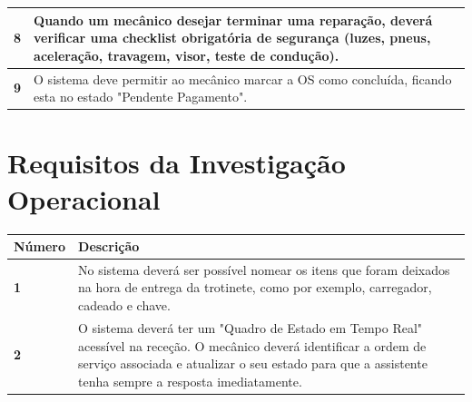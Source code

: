 \documentclass[11pt,a4paper]{article}
\begin{document}
\begin{tabularx}{\textwidth}{@{}|l|X|@{}}
		\textbf{8} & Quando um mecânico desejar terminar uma reparação, deverá verificar uma checklist obrigatória de segurança (luzes, pneus, aceleração, travagem, visor, teste de condução). \\ \hline
		\textbf{9} & O sistema deve permitir ao mecânico marcar a OS como concluída, ficando esta no estado "Pendente Pagamento". \\ \hline
	\end{tabularx}
	
	\section*{Requisitos da Investigação Operacional}
	
	\begin{tabularx}{\textwidth}{@{}|l|X|@{}}
		\hline
		\rowcolor{gray!10} \textbf{Número} & \textbf{Descrição} \\ \hline
		\textbf{1} & No sistema deverá ser possível nomear os itens que foram deixados na hora de entrega da trotinete, como por exemplo, carregador, cadeado e chave.  \\ \hline
		\textbf{2} & O sistema deverá ter um "Quadro de Estado em Tempo Real" \space acessível na receção. O mecânico deverá identificar a ordem de serviço associada e atualizar o seu estado para que a assistente tenha sempre a resposta imediatamente. \\ \hline
	\end{tabularx}
	
\end{document}
